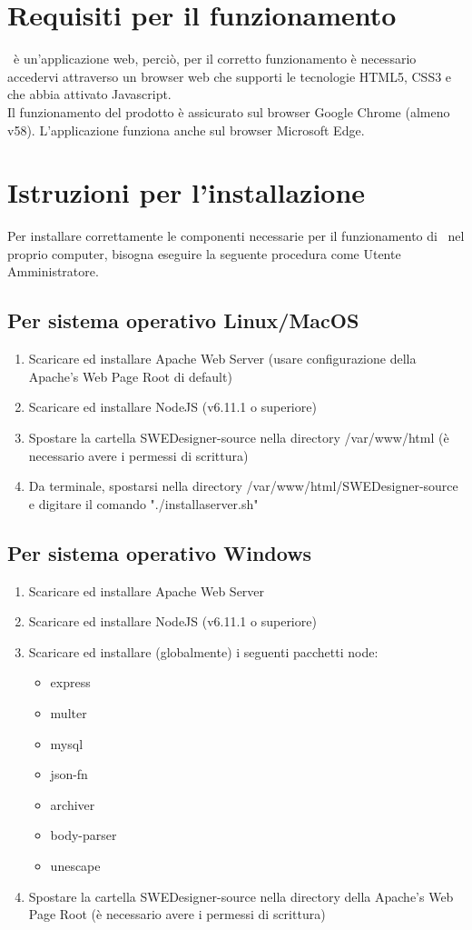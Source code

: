 \documentclass[../ManualeUtente.tex]{subfiles}
\begin{document}
	\section{Requisiti per il funzionamento}
		\progetto\ è un'applicazione web, perciò, per il corretto funzionamento
		è necessario accedervi attraverso un browser web che supporti le
		tecnologie HTML5, CSS3 e che abbia attivato Javascript.\\
		Il funzionamento del prodotto è assicurato sul browser Google Chrome (almeno v58).
		L'applicazione funziona anche sul browser Microsoft Edge.
	\section{Istruzioni per l'installazione}\label{sez:installIstr}
		Per installare correttamente le componenti necessarie per il funzionamento di \progetto\ nel proprio computer,
		bisogna eseguire la seguente procedura come Utente Amministratore.
		\subsection{Per sistema operativo Linux/MacOS}
			\begin{enumerate}
				\item Scaricare ed installare Apache Web Server (usare configurazione della
				Apache's Web Page Root di default)
				\item Scaricare ed installare NodeJS (v6.11.1 o superiore)
	 			\item Spostare la cartella SWEDesigner-source nella directory /var/www/html
	 			(è necessario avere i permessi di scrittura)
	 			\item Da terminale, spostarsi nella directory /var/www/html/SWEDesigner-source e digitare il comando
	 			"./installaserver.sh"
			\end{enumerate}
		\subsection{Per sistema operativo Windows}
			\begin{enumerate}
				\item Scaricare ed installare Apache Web Server
	 			\item Scaricare ed installare NodeJS (v6.11.1 o superiore)
 				\item Scaricare ed installare (globalmente) i seguenti pacchetti node:
 				\begin{itemize}
 					\item express
 					\item multer
 					\item mysql
 					\item json-fn
 					\item archiver
 					\item body-parser
 					\item unescape
 				\end{itemize}
 				\item Spostare la cartella SWEDesigner-source nella directory della Apache's Web Page Root
 				(è necessario avere i permessi di scrittura)
			\end{enumerate}
\end{document}
